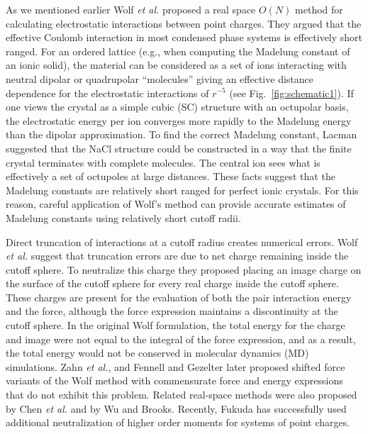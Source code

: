 As we mentioned earlier Wolf \textit{et al.}\cite{Wolf99} proposed a real space $O(N)$ method for calculating electrostatic interactions between point charges. They argued that the effective Coulomb interaction in most condensed phase systems is effectively short
ranged.\cite{Wolf92,Wolf95} For an ordered lattice (e.g., when
computing the Madelung constant of an ionic solid), the material can
be considered as a set of ions interacting with neutral dipolar or
quadrupolar ``molecules'' giving an effective distance dependence for
the electrostatic interactions of $r^{-5}$ (see Fig.~\ref{fig:schematic1}). If one views the  crystal as a simple
cubic (SC) structure with an octupolar  basis, the
electrostatic energy per ion converges more rapidly to the Madelung
energy than the dipolar approximation.\cite{Wolf92} To find the
correct Madelung constant, Lacman suggested that the NaCl structure
could be constructed in a way that the finite crystal terminates with
complete  molecules.\cite{Lacman65} The central ion sees
what is effectively a set of octupoles at large distances. These facts
suggest that the Madelung constants are relatively short ranged for
perfect ionic crystals.\cite{Wolf99} For this reason, careful
application of Wolf's method can provide accurate estimates of
Madelung constants using relatively short cutoff radii.

Direct truncation of interactions at a cutoff radius creates numerical
errors.  Wolf \textit{et al.} suggest that truncation errors are due
to net charge remaining inside the cutoff sphere.\cite{Wolf99} To
neutralize this charge they proposed placing an image charge on the
surface of the cutoff sphere for every real charge inside the cutoff sphere. These charges are present for the evaluation of both the pair
interaction energy and the force, although the force expression
maintains a discontinuity at the cutoff sphere.  In the original Wolf
formulation, the total energy for the charge and image were not equal
to the integral of the force expression, and as a result, the total
energy would not be conserved in molecular dynamics (MD)
simulations.\cite{Zahn02} Zahn \textit{et al.}, and Fennell and
Gezelter later proposed shifted force variants of the Wolf method with
commensurate force and energy expressions that do not exhibit this
problem.\cite{Zahn02,Gezelter06} Related real-space methods
were also proposed by Chen \textit{et al.} \cite{Chen04,Chen06,Denesyuk08,Rodgers06}
and by Wu and Brooks.\cite{Wu05} Recently, Fukuda has successfully
used additional neutralization of higher order moments for systems of
point charges.\cite{Fukuda13}


